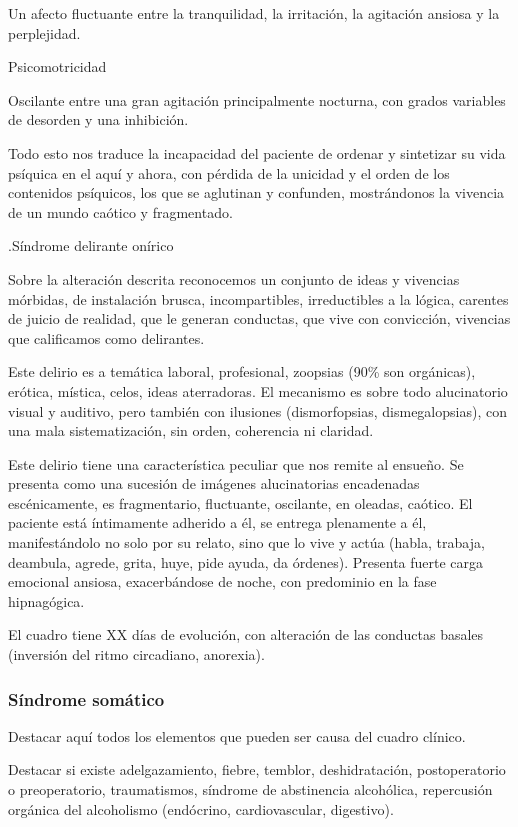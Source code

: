 \documentclass{scrbook}
\begin{document}
Un afecto fluctuante entre la tranquilidad, la irritación, la agitación ansiosa y la perplejidad.

Psicomotricidad

Oscilante entre una gran agitación principalmente nocturna, con grados variables de desorden y una inhibición.

Todo esto nos traduce la incapacidad del paciente de ordenar y sintetizar su vida psíquica en el aquí y ahora, con pérdida de la unicidad y el orden de los contenidos psíquicos, los que se aglutinan y confunden, mostrándonos la vivencia de un mundo caótico y fragmentado.

.Síndrome delirante onírico

Sobre la alteración descrita reconocemos un conjunto de ideas y vivencias mórbidas, de instalación brusca, incompartibles, irreductibles a la lógica, carentes de juicio de realidad, que le generan conductas, que vive con convicción, vivencias que calificamos como delirantes.

Este delirio es a temática laboral, profesional, zoopsias (90\% son orgánicas), erótica, mística, celos, ideas aterradoras. El mecanismo es sobre todo alucinatorio visual y auditivo, pero también con ilusiones (dismorfopsias, dismegalopsias), con una mala sistematización, sin orden, coherencia ni claridad.

Este delirio tiene una característica peculiar que nos remite al ensueño. Se presenta como una sucesión de imágenes alucinatorias encadenadas escénicamente, es fragmentario, fluctuante, oscilante, en oleadas, caótico. El paciente está íntimamente adherido a él, se entrega plenamente a él, manifestándolo no solo por su relato, sino que lo vive y actúa (habla, trabaja, deambula, agrede, grita, huye, pide ayuda, da órdenes). Presenta fuerte carga emocional ansiosa, exacerbándose de noche, con predominio en la fase hipnagógica.

El cuadro tiene XX días de evolución, con alteración de las conductas basales (inversión del ritmo circadiano, anorexia).

\subsubsection*{Síndrome somático}

Destacar aquí todos los elementos que pueden ser causa del cuadro clínico.

Destacar si existe adelgazamiento, fiebre, temblor, deshidratación, postoperatorio o preoperatorio, traumatismos, síndrome de abstinencia alcohólica, repercusión orgánica del alcoholismo (endócrino, cardiovascular, digestivo).
\end{document}
